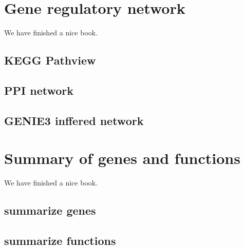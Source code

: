 \documentclass[
  a4paper,
  oneside]{book}
\begin{document}
\hypertarget{gene-regulatory-network}{%
\chapter{Gene regulatory network}\label{gene-regulatory-network}}

We have finished a nice book.

\hypertarget{kegg-pathview}{%
\section{KEGG Pathview}\label{kegg-pathview}}

\hypertarget{ppi-network}{%
\section{PPI network}\label{ppi-network}}

\hypertarget{genie3-inffered-network}{%
\section{GENIE3 inffered network}\label{genie3-inffered-network}}

\hypertarget{summary-of-genes-and-functions}{%
\chapter{Summary of genes and functions}\label{summary-of-genes-and-functions}}

We have finished a nice book.

\hypertarget{summarize-genes}{%
\section{summarize genes}\label{summarize-genes}}

\hypertarget{summarize-functions}{%
\section{summarize functions}\label{summarize-functions}}

  
\end{document}
